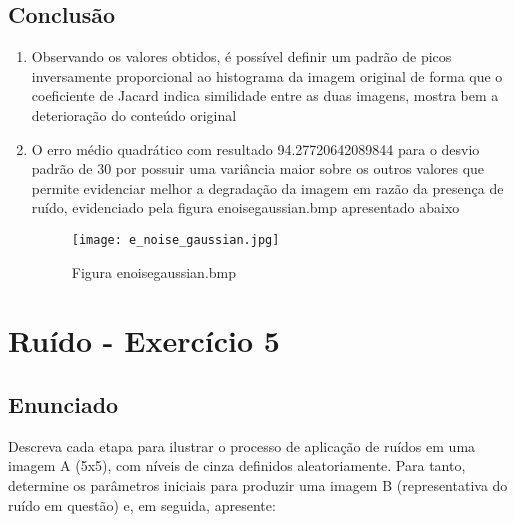 \documentclass[10pt,a4paper]{article}
\begin{document}


\subsection{Conclusão}

\begin{enumerate}[label=\roman*.]
\item Observando os valores obtidos, é possível definir um padrão de picos inversamente proporcional ao histograma da imagem original de forma que o coeficiente de Jacard indica similidade entre as duas imagens, mostra bem a deterioração do conteúdo original

\begin{figure}[H]
    \centering
    \qquad
    \qquad
\end{figure}

\item O erro médio quadrático com resultado 94.27720642089844 para o desvio padrão de 30 por possuir uma variância maior sobre os outros valores que permite evidenciar melhor a degradação da imagem em razão da presença de ruído, evidenciado pela figura e\textunderscore noise\textunderscore gaussian.bmp apresentado abaixo

\begin{figure}[H]
    \centering
    \texttt{[image: e\_noise\_gaussian.jpg]}
    \caption{Figura e\textunderscore noise\textunderscore gaussian.bmp}
    \label{fig:enoisegausian}
\end{figure}

\end{enumerate}


\section{Ruído - Exercício 5}

\subsection{Enunciado}

Descreva cada etapa para ilustrar o processo de aplicação de ruídos em uma imagem A (5x5), com níveis de cinza definidos aleatoriamente. Para tanto, determine os parâmetros
iniciais para produzir uma imagem B (representativa do ruído em questão) e, em seguida, apresente: 
\end{document}
